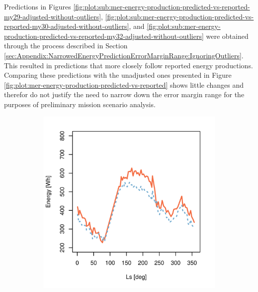 Predictions in Figures \ref{fig:plot:sub:mer-energy-production-predicted-vs-reported-my29-adjusted-without-outliers}, \ref{fig:plot:sub:mer-energy-production-predicted-vs-reported-my30-adjusted-without-outliers}, and \ref{fig:plot:sub:mer-energy-production-predicted-vs-reported-my32-adjusted-without-outliers} were obtained through the process described in Section \ref{sec:Appendix:NarrowedEnergyPredictionErrorMarginRange:IgnoringOutliers}. This resulted in predictions that more closely follow reported energy productions. Comparing these predictions with the unadjusted ones presented in Figure \ref{fig:plot:mer-energy-production-predicted-vs-reported} shows little changes and therefor do not justify the need to narrow down the error margin range for the purposes of preliminary mission scenario analysis.

\begin{figure}[h]
\captionsetup[subfigure]{justification=centering}
\vspace{-2ex}
	\centering
    \setlength{\subfigureWidth}{0.32\textwidth}
    \setlength{\graphicsHeight}{50mm}
    \hypersetup{hidelinks=true}%
	\begin{subfigure}[t]{\subfigureWidth}
        \centering
		\includegraphics[height=\graphicsHeight]{sections/appendix/energy-error-margin/plots/predicted-vs-measured-energy-my29-adjusted.png}

\end{subfigure}
\end{figure}
